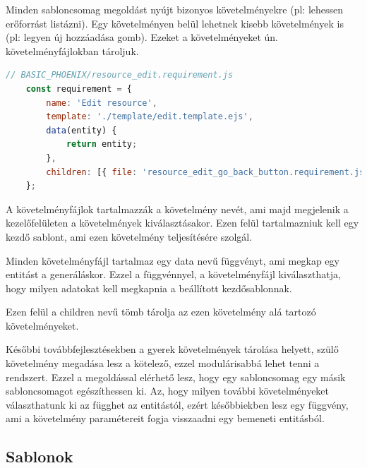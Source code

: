 \documentclass[a4paper,12pt,oneside]{report}
\begin{document}
\begin{justify}

	Minden sabloncsomag megoldást nyújt bizonyos követelményekre (pl: lehessen erőforrást listázni). Egy követelményen belül lehetnek kisebb követelmények is (pl: legyen új hozzáadása gomb). Ezeket a követelményeket ún. követelményfájlokban tároljuk. 

	\begin{lstlisting}[language=javascript]
	// BASIC_PHOENIX/resource_edit.requirement.js
	const requirement = {
		name: 'Edit resource',
		template: './template/edit.template.ejs',
		data(entity) {
			return entity;
		},
		children: [{ file: 'resource_edit_go_back_button.requirement.js' }]
	};
	\end{lstlisting}

	A követelményfájlok tartalmazzák a követelmény nevét, ami majd megjelenik a kezelőfelületen a követelmények kiválasztásakor. Ezen felül tartalmazniuk kell egy kezdő sablont, ami ezen követelmény teljesítésére szolgál.

	Minden követelményfájl tartalmaz egy data nevű függvényt, ami megkap egy entitást a generáláskor. Ezzel a függvénnyel, a követelményfájl kiválaszthatja, hogy milyen adatokat kell megkapnia a beállított kezdősablonnak. 

	Ezen felül a children nevű tömb tárolja az ezen követelmény alá tartozó követelményeket. 

	Későbbi továbbfejlesztésekben a gyerek követelmények tárolása helyett, szülő követelmény megadása lesz a kötelező, ezzel modulárisabbá lehet tenni a rendszert. Ezzel a megoldással elérhető lesz, hogy egy sabloncsomag egy másik sabloncsomagot egészíthessen ki. Az, hogy milyen további követelményeket választhatunk ki az függhet az entitástól, ezért későbbiekben lesz egy függvény, ami a követelmény paramétereit fogja visszaadni egy bemeneti entitásból. 

\end{justify}

\newpage
\subsection{Sablonok}
\end{document}
